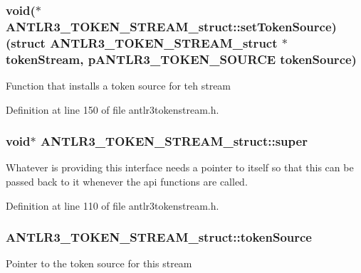 \hypertarget{struct_a_n_t_l_r3___t_o_k_e_n___s_t_r_e_a_m__struct_ab03965c892e5e41ecbea0967570595d6}{
\subsubsection[{set\-Token\-Source}]{\setlength{\rightskip}{0pt plus 5cm}void($\ast$ A\-N\-T\-L\-R3\-\_\-\-T\-O\-K\-E\-N\-\_\-\-S\-T\-R\-E\-A\-M\-\_\-struct\-::set\-Token\-Source)(struct {\bf A\-N\-T\-L\-R3\-\_\-\-T\-O\-K\-E\-N\-\_\-\-S\-T\-R\-E\-A\-M\-\_\-struct} $\ast$token\-Stream, {\bf p\-A\-N\-T\-L\-R3\-\_\-\-T\-O\-K\-E\-N\-\_\-\-S\-O\-U\-R\-C\-E} {\bf token\-Source})}}\label{struct_a_n_t_l_r3___t_o_k_e_n___s_t_r_e_a_m__struct_ab03965c892e5e41ecbea0967570595d6}
Function that installs a token source for teh stream 

Definition at line 150 of file antlr3tokenstream.\-h.

\hypertarget{struct_a_n_t_l_r3___t_o_k_e_n___s_t_r_e_a_m__struct_a2da57a078b0dc782d15ffd0b94469729}{
\subsubsection[{super}]{\setlength{\rightskip}{0pt plus 5cm}void$\ast$ A\-N\-T\-L\-R3\-\_\-\-T\-O\-K\-E\-N\-\_\-\-S\-T\-R\-E\-A\-M\-\_\-struct\-::super}}\label{struct_a_n_t_l_r3___t_o_k_e_n___s_t_r_e_a_m__struct_a2da57a078b0dc782d15ffd0b94469729}
Whatever is providing this interface needs a pointer to itself so that this can be passed back to it whenever the api functions are called. 

Definition at line 110 of file antlr3tokenstream.\-h.

\hypertarget{struct_a_n_t_l_r3___t_o_k_e_n___s_t_r_e_a_m__struct_aa8a928aa966f26d92e8c25e0e369d319}{
\subsubsection[{token\-Source}]{ A\-N\-T\-L\-R3\-\_\-\-T\-O\-K\-E\-N\-\_\-\-S\-T\-R\-E\-A\-M\-\_\-struct\-::token\-Source}}\label{struct_a_n_t_l_r3___t_o_k_e_n___s_t_r_e_a_m__struct_aa8a928aa966f26d92e8c25e0e369d319}
Pointer to the token source for this stream 

